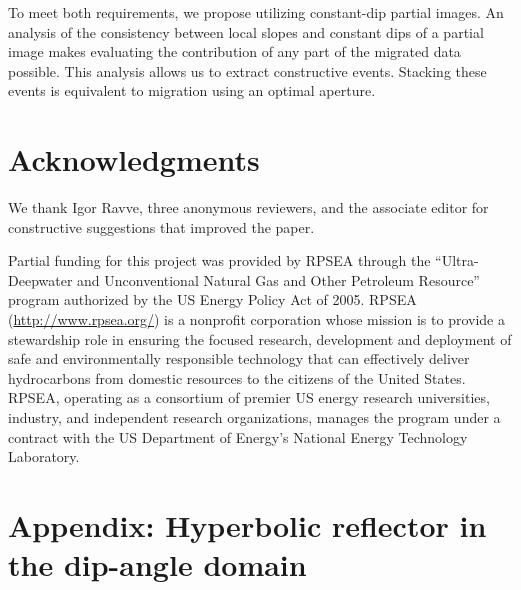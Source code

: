 To meet both requirements, we propose utilizing constant-dip partial images. An analysis of the consistency between local slopes and
constant dips of a partial image makes evaluating the contribution of any part of the migrated data possible. This analysis allows us
to extract constructive events. Stacking these events is equivalent to migration using an optimal aperture.

\section{Acknowledgments}

We thank Igor Ravve, three anonymous reviewers, and the associate editor  for constructive suggestions that improved the paper.

Partial funding for this project was provided by RPSEA through the “Ultra-Deepwater and Unconventional 
Natural Gas and Other Petroleum Resource” program authorized by the US Energy Policy Act of 2005. 
RPSEA (\url{http://www.rpsea.org/}) is a nonprofit corporation whose mission is to provide a stewardship 
role in ensuring the focused research, development and deployment of safe and environmentally
responsible technology that can effectively deliver hydrocarbons from domestic resources to the 
citizens of the United States. RPSEA, operating as a consortium of premier US energy research universities, 
industry, and independent research organizations, manages the program under a contract with the US Department 
of Energy's National Energy Technology Laboratory.

\appendix
\section{Appendix: Hyperbolic reflector in the dip-angle domain}

